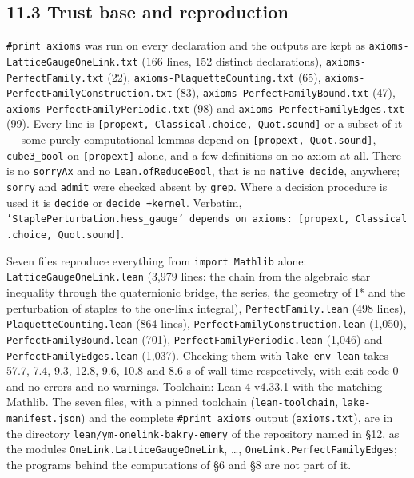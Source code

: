 \documentclass[11pt,a4paper]{article}
\theoremstyle{named}
\begin{document}
\subsection*{11.3 Trust base and reproduction}
\texttt{\#print\ \allowbreak{}axioms} was run on every declaration and the outputs are kept as \texttt{axioms-LatticeGaugeOneLink.\allowbreak{}txt} (166 lines, 152 distinct declarations), \texttt{axioms-PerfectFamily.\allowbreak{}txt} (22), \texttt{axioms-PlaquetteCounting.\allowbreak{}txt} (65), \texttt{axioms-PerfectFamilyConstruction.\allowbreak{}txt} (83), \texttt{axioms-PerfectFamilyBound.\allowbreak{}txt} (47), \texttt{axioms-PerfectFamilyPeriodic.\allowbreak{}txt} (98) and \texttt{axioms-PerfectFamilyEdges.\allowbreak{}txt} (99). Every line is \texttt{[propext,\ \allowbreak{}Classical.\allowbreak{}choice,\ \allowbreak{}Quot.\allowbreak{}sound]} or a subset of it — some purely computational lemmas depend on \texttt{[propext,\ \allowbreak{}Quot.\allowbreak{}sound]}, \texttt{cube3\_\allowbreak{}bool} on \texttt{[propext]} alone, and a few definitions on no axiom at all. There is no \texttt{sorryAx} and no \texttt{Lean.\allowbreak{}ofReduceBool}, that is no \texttt{native\_\allowbreak{}decide}, anywhere; \texttt{sorry} and \texttt{admit} were checked absent by \texttt{grep}. Where a decision procedure is used it is \texttt{decide} or \texttt{decide\ \allowbreak{}+kernel}. Verbatim, \texttt{'StaplePerturbation.\allowbreak{}hess\_\allowbreak{}gauge'\ \allowbreak{}depends\ \allowbreak{}on\ \allowbreak{}axioms:\ \allowbreak{}[propext,\ \allowbreak{}Classical.\allowbreak{}choice,\ \allowbreak{}Quot.\allowbreak{}sound]}.

Seven files reproduce everything from \texttt{import\ \allowbreak{}Mathlib} alone: \texttt{LatticeGaugeOneLink.\allowbreak{}lean} (3,979 lines: the chain from the algebraic star inequality through the quaternionic bridge, the series, the geometry of I* and the perturbation of staples to the one-link integral), \texttt{PerfectFamily.\allowbreak{}lean} (498 lines), \texttt{PlaquetteCounting.\allowbreak{}lean} (864 lines), \texttt{PerfectFamilyConstruction.\allowbreak{}lean} (1,050), \texttt{PerfectFamilyBound.\allowbreak{}lean} (701), \texttt{PerfectFamilyPeriodic.\allowbreak{}lean} (1,046) and \texttt{PerfectFamilyEdges.\allowbreak{}lean} (1,037). Checking them with \texttt{lake\ \allowbreak{}env\ \allowbreak{}lean} takes 57.7, 7.4, 9.3, 12.8, 9.6, 10.8 and 8.6 s of wall time respectively, with exit code 0 and no errors and no warnings. Toolchain: Lean 4 v4.33.1 with the matching Mathlib. The seven files, with a pinned toolchain (\texttt{lean-toolchain}, \texttt{lake-manifest.json}) and the complete \texttt{\#print\ \allowbreak{}axioms} output (\texttt{axioms.\allowbreak{}txt}), are in the directory \texttt{lean/\allowbreak{}ym-onelink-bakry-emery} of the repository named in §12, as the modules \texttt{OneLink.\allowbreak{}LatticeGaugeOneLink}, \dots, \texttt{OneLink.\allowbreak{}PerfectFamilyEdges}; the programs behind the computations of §6 and §8 are not part of it.
\end{document}

